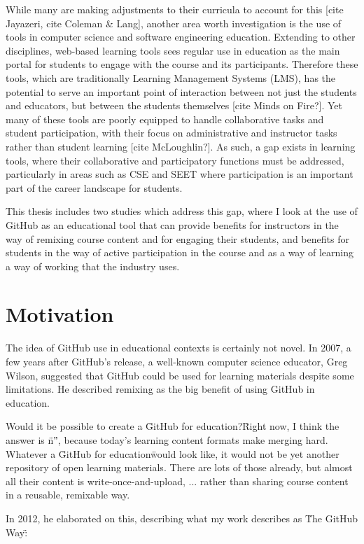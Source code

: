 While many are making adjustments to their curricula to account for this [cite Jayazeri, cite Coleman \& Lang], another area worth investigation is the use of tools in computer science and software engineering education. Extending to other disciplines, web-based learning tools sees regular use in education as the main portal for students to engage with the course and its participants. Therefore these tools, which are traditionally Learning Management Systems (LMS), has the potential to serve an important point of interaction between not just the students and educators, but between the students themselves [cite Minds on Fire?]. Yet many of these tools are poorly equipped to handle collaborative tasks and student participation, with their focus on administrative and instructor tasks rather than student learning [cite McLoughlin?]. As such, a gap exists in learning tools, where their collaborative and participatory functions must be addressed, particularly in areas such as CSE and SEET where participation is an important part of the career landscape for students.

This thesis includes two studies which address this gap, where I look at the use of GitHub as an educational tool that can provide benefits for instructors in the way of remixing course content and for engaging their students, and benefits for students in the way of active participation in the course and as a way of learning a way of working that the industry uses. %

\section{Motivation}
The idea of GitHub use in educational contexts is certainly not novel. In 2007, a few years after GitHub's release, a well-known computer science educator, Greg Wilson, suggested that GitHub could be used for learning materials despite some limitations. He described remixing as the big benefit of using GitHub in education.

Would it be possible to create a \"GitHub for education?\" Right now, I think the answer is \"n\"”, because today's learning content formats make merging hard. Whatever a \"GitHub for education\" would look like, it would not be yet another repository of open learning materials. There are lots of those already, but almost all their content is write-once-and-upload, ... rather than sharing course content in a reusable, remixable way.

In 2012, he elaborated on this, describing what my work describes as \"The GitHub Way\":

